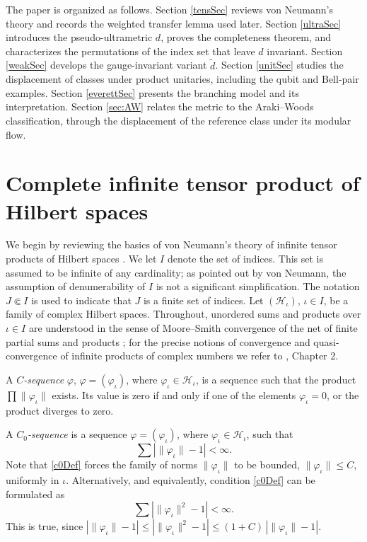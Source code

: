 \documentclass[twoside,11pt,letter]{article}
\def\cH{{\mathcal{H}}}
\theoremstyle{definition}
\theoremstyle{definition}
\theoremstyle{plain}
\begin{document}
The paper is organized as follows. Section \ref{tensSec} reviews von Neumann's theory and records the weighted transfer lemma used later. Section \ref{ultraSec} introduces the pseudo-ultrametric $d$, proves the completeness theorem, and characterizes the permutations of the index set that leave $d$ invariant. Section \ref{weakSec} develops the gauge-invariant variant $\tilde d$. Section \ref{unitSec} studies the displacement of classes under product unitaries, including the qubit and Bell-pair examples. Section \ref{everettSec} presents the branching model and its interpretation. Section \ref{sec:AW} relates the metric to the Araki--Woods classification, through the displacement of the reference class under its modular flow.

\section{\label{tensSec}Complete infinite tensor product of Hilbert spaces}

We begin by reviewing the basics of von Neumann's theory of infinite tensor products of Hilbert spaces \cite{vN39}. We let $I$ denote the set of indices. This set is assumed to be infinite of any cardinality; as pointed out by von Neumann, the assumption of denumerability of $I$ is not a significant simplification. The notation $J\Subset I$ is used to indicate that $J$ is a finite set of indices. Let $(\cH_\iota)$, $\iota\in I$, be a family of complex Hilbert spaces. Throughout, unordered sums and products over $\iota\in I$ are understood in the sense of Moore--Smith convergence of the net of finite partial sums and products \cite{K55}; for the precise notions of convergence and quasi-convergence of infinite products of complex numbers we refer to \cite{vN39}, Chapter 2.

A \textit{$C$-sequence} $\varphi$, $\varphi=(\varphi_\iota)$, where $\varphi_\iota\in\cH_\iota$, is a sequence such that the product $\prod\|\varphi_\iota\|$ exists. Its value is zero if and only if one of the elements $\varphi_\iota=0$, or the product diverges to zero.

A \textit{$C_0$-sequence} is a sequence $\varphi=(\varphi_\iota)$, where $\varphi_\iota\in\cH_\iota$, such that
\begin{equation}\label{c0Def}
\sum|\|\varphi_\iota\|-1|<\infty.
\end{equation}
Note that \eqref{c0Def} forces the family of norms $\|\varphi_\iota\|$ to be bounded, $\|\varphi_\iota\|\leq C$, uniformly in $\iota$. Alternatively, and equivalently, condition \eqref{c0Def} can be formulated as
\begin{equation}\label{c0Eq}
\sum|\|\varphi_\iota\|^2-1|<\infty.
\end{equation}
This is true, since $|\|\varphi_\iota\|-1|\leq |\|\varphi_\iota\|^2-1|\leq (1+C)\, |\|\varphi_\iota\|-1|$.
\end{document}
